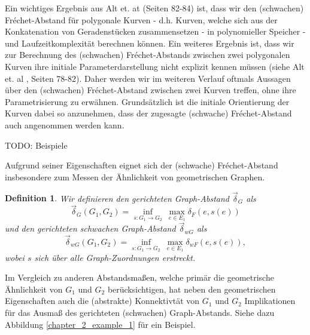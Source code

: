 \documentclass[a4paper, 12pt, twoside]{article}
\theoremstyle{Format1} %
\newtheorem{Def}{Definition}[section]       %
\begin{document}
Ein wichtiges Ergebnis aus Alt et. at \cite{Alt} (Seiten 82-84) ist, dass wir den (schwachen) Fréchet-Abstand für polygonale Kurven - d.h. Kurven, welche sich aus der Konkatenation von Geradenstücken zusammensetzen - in
polynomieller Speicher - und Laufzeitkomplexität berechnen können. Ein weiteres Ergebnis ist,
dass wir zur Berechnung des (schwachen) Fréchet-Abstands zwischen zwei polygonalen Kurven ihre initiale Parameterdarstellung nicht explizit kennen müssen (siehe Alt et. al \cite{Alt}, Seiten 78-82).
Daher werden wir im weiteren Verlauf oftmals Aussagen über den (schwachen) Fréchet-Abstand zwischen zwei Kurven treffen, ohne ihre Parametrisierung zu erwähnen. Grundsätzlich ist die initiale Orientierung der Kurven dabei
so anzunehmen, dass der zugesagte (schwache) Fréchet-Abstand auch angenommen werden kann.

TODO: Beispiele

Aufgrund seiner Eigenschaften eignet sich der (schwache) Fréchet-Abstand insbesondere zum Messen der Ähnlichkeit von geometrischen Graphen.

\begin{Def} \label{Definition Graph-Abstand}
	Wir definieren den \textit{gerichteten Graph-Abstand} $ \vec{\delta}_G $ als
	$$ \vec{\delta}_G(G_1,G_2) = \inf_{s: G_1 \to G_2} \: \max_{e \in E_1} \delta_F(e, s(e)) $$
	und den \textit{gerichteten schwachen Graph-Abstand} $ \vec{\delta}_{wG} $ als
	$$  \vec{\delta}_{wG}(G_1,G_2) = \inf_{s: G_1 \to G_2} \: \max_{e \in E_1} {\delta}_{wF}(e, s(e)), $$
	wobei $s$ sich über alle Graph-Zuordnungen erstreckt.
\end{Def}

Im Vergleich zu anderen Abstandsmaßen,
welche primär die geometrische Ähnlichkeit von $G_1$ und $G_2$ berücksichtigen, hat neben den geometrischen Eigenschaften auch die (abstrakte) Konnektivtät von $G_1$ und $G_2$
Implikationen für das Ausmaß des gerichteten (schwachen) Graph-Abstands. Siehe dazu Abbildung \ref{chapter_2_example_1} für ein Beispiel.
\end{document}
